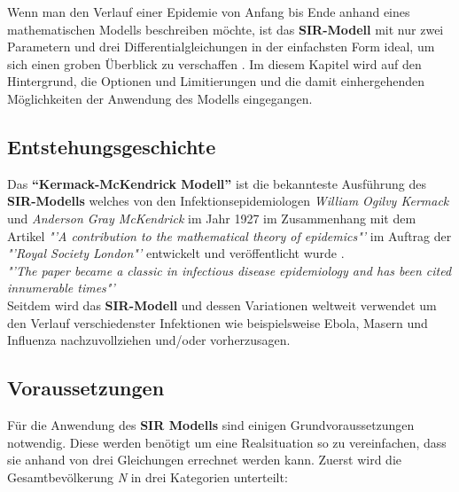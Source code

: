 \documentclass[12pt]{scrartcl} %
\begin{document}
Wenn man den Verlauf einer Epidemie von Anfang bis Ende anhand eines mathematischen Modells beschreiben möchte, ist das \textbf{SIR-Modell} mit nur zwei Parametern und drei Differentialgleichungen in der einfachsten Form ideal, um sich einen groben Überblick zu verschaffen \cite{4}.
Im diesem Kapitel wird auf den Hintergrund, die Optionen und Limitierungen und die damit einhergehenden Möglichkeiten der Anwendung des Modells eingegangen.


\subsection{Entstehungsgeschichte}

Das \textbf{"`Kermack-McKendrick Modell"'} ist die bekannteste Ausführung des \textbf{SIR-Modells} welches von den Infektionsepidemiologen \textsl{William Ogilvy Kermack} und \textsl{Anderson Gray McKendrick} im Jahr 1927 im Zusammenhang mit dem Artikel 
\textsl{"'A contribution to the mathematical theory of epidemics"'} \cite{7} im Auftrag der \textsl{"'Royal Society London"'} entwickelt und veröffentlicht wurde \cite{6}.\\

\textsl{"'The paper became a classic in infectious disease epidemiology and has been cited innumerable times"'} \cite[s. 1]{6} \\

Seitdem wird das \textbf{SIR-Modell} und dessen Variationen weltweit verwendet um den Verlauf verschiedenster Infektionen
wie beispielsweise Ebola, Masern und Influenza nachzuvollziehen und/oder vorherzusagen. \cite{3}



\subsection{Voraussetzungen}

Für die Anwendung des \textbf{SIR Modells} sind einigen Grundvoraussetzungen notwendig. Diese werden benötigt um eine Realsituation so zu vereinfachen, dass sie anhand von drei Gleichungen errechnet werden kann.
Zuerst wird die Gesamtbevölkerung \textit{N} in drei Kategorien unterteilt:
\end{document}
